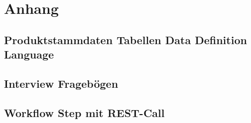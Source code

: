 \chapter{Anhang}\label{app:Anhang}

\section{Produktstammdaten Tabellen Data Definition Language}\label{app:ddl}

\pagebreak
\section{Interview Fragebögen}\label{app:fragen}










\section{Workflow Step mit REST-Call}\label{app:db2prov}
